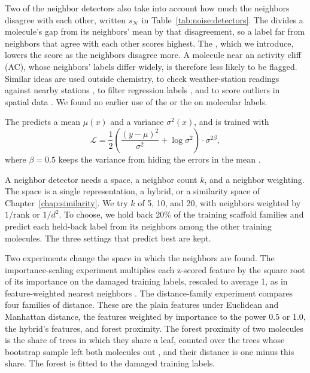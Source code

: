 Two of the neighbor detectors also take into account how much the neighbors disagree with each other, written $s_{\mathcal{N}}$ in Table~\ref{tab:noise:detectors}. The  divides a molecule's gap from its neighbors' mean by that disagreement, so a label far from neighbors that agree with each other scores highest. The , which we introduce, lowers the score as the neighbors disagree more. A molecule near an activity cliff (AC), whose neighbors' labels differ widely, is therefore less likely to be flagged. Similar ideas are used outside chemistry, to check weather-station readings against nearby stations \citep{Baserud2020}, to filter regression labels \citep{Kordos2012}, and to score outliers in spatial data \citep{Chawla2006}. We found no earlier use of the  or the  on molecular labels.

The  predicts a mean $\mu(x)$ and a variance $\sigma^2(x)$, and is trained with
\begin{equation}
\mathcal{L} = \frac{1}{2}\left(\frac{(y - \mu)^2}{\sigma^2} + \log \sigma^2\right) \cdot \sigma^{2\beta},
\label{eq:beta_nll}
\end{equation}
where $\beta = 0.5$ keeps the variance from hiding the errors in the mean \citep{Seitzer2022}.

A neighbor detector needs a space, a neighbor count $k$, and a neighbor weighting. The space is a single representation, a hybrid, or a similarity space of Chapter~\ref{chap:similarity}. We try $k$ of 5, 10, and 20, with neighbors weighted by $1/\text{rank}$ or $1/d^2$. To choose, we hold back 20\% of the training scaffold families and predict each held-back label from its neighbors among the other training molecules. The three settings that predict best are kept.

Two experiments change the space in which the neighbors are found. The importance-scaling experiment multiplies each z-scored feature by the square root of its importance on the damaged training labels, rescaled to average 1, as in feature-weighted nearest neighbors \citep{Wettschereck1997}. The distance-family experiment compares four families of distance. These are the plain features under Euclidean and Manhattan distance, the features weighted by importance to the power 0.5 or 1.0, the hybrid's features, and forest proximity. The forest proximity of two molecules is the share of trees in which they share a leaf, counted over the trees whose bootstrap sample left both molecules out \citep{Liaw2002}, and their distance is one minus this share. The forest is fitted to the damaged training labels.

